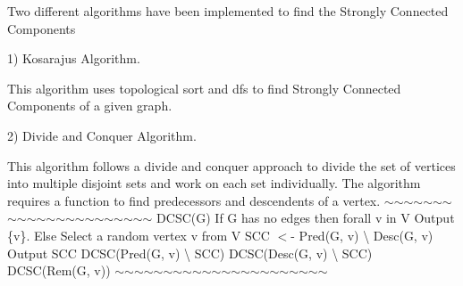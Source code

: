 Two different algorithms have been implemented to find the Strongly Connected Components

1) Kosaraju\textquotesingle{}s Algorithm.
\begin{DoxyItemize}
\item This algorithm uses topological sort and dfs to find Strongly Connected Components of a given graph.
\end{DoxyItemize}

2) Divide and Conquer Algorithm.
\begin{DoxyItemize}
\item This algorithm follows a divide and conquer approach to divide the set of vertices into multiple disjoint sets and work on each set individually. The algorithm requires a function to find predecessors and descendents of a vertex. $\sim$$\sim$$\sim$$\sim$$\sim$$\sim$$\sim$$\sim$$\sim$$\sim$$\sim$$\sim$$\sim$$\sim$$\sim$$\sim$$\sim$$\sim$$\sim$$\sim$$\sim$$\sim$ D\+C\+S\+C(\+G) If G has no edges then forall v in V Output \{v\}. Else Select a random vertex v from V S\+CC $<$-\/ Pred(\+G, v) \textbackslash{} Desc(\+G, v) Output S\+CC D\+C\+SC(Pred(\+G, v) \textbackslash{} S\+CC) D\+C\+SC(Desc(\+G, v) \textbackslash{} S\+CC) D\+C\+S\+C(\+Rem(\+G, v)) $\sim$$\sim$$\sim$$\sim$$\sim$$\sim$$\sim$$\sim$$\sim$$\sim$$\sim$$\sim$$\sim$$\sim$$\sim$$\sim$$\sim$$\sim$$\sim$$\sim$$\sim$$\sim$ 
\end{DoxyItemize}